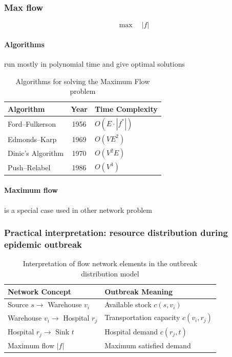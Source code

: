\documentclass[12pt, openany]{article}
\begin{document}
\subsubsection{Max flow}
\[
\max \quad |f|
\]
\paragraph{Algorithms} run mostly in polynomial time and give optimal solutions
\begin{table}[h]
\centering
\begin{tabular}{|l|c|l|}
\hline
\textbf{Algorithm} & \textbf{Year} & \textbf{Time Complexity} \\
\hline
Ford--Fulkerson & 1956 & $O(E \cdot |f^*|)$ \\
Edmonds--Karp & 1969 & $O(VE^2)$ \\
Dinic's Algorithm & 1970 & $O(V^2E)$ \\
Push--Relabel & 1986 & $O(V^3)$ \\
\hline
\end{tabular}
\caption{Algorithms for solving the Maximum Flow problem}
\end{table}
\paragraph{Maximum flow} is a special case used in other network problem


\subsubsection{Practical interpretation: resource distribution during epidemic outbreak}
\begin{table}[h]
\centering
\begin{tabular}{|l|l|}
\hline
\textbf{Network Concept} & \textbf{Outbreak Meaning} \\
\hline
Source $s \rightarrow$ Warehouse $v_i$ & Available stock $c(s,v_i)$ \\
\hline
Warehouse $v_i \rightarrow$ Hospital $r_j$ & Transportation capacity $c(v_i,r_j)$ \\
\hline
Hospital $r_j \rightarrow$ Sink $t$ & Hospital demand $c(r_j,t)$ \\
\hline
Maximum flow $|f|$ & Maximum satisfied demand \\
\hline
\end{tabular}
\caption{Interpretation of flow network elements in the outbreak distribution model}
\end{table}
\end{document}
